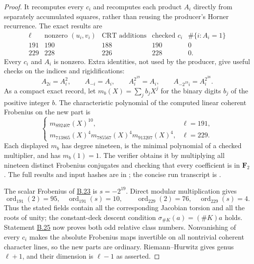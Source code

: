 \documentclass[11pt,a4paper]{article}
\newcommand{\statementref}[1]{\hyperlink{#1}{#1}}
\begin{document}
\begin{proof}
It recomputes every $c_i$ and recomputes each product $A_i$ directly
from separately accumulated squares, rather than reusing the
producer's Horner recurrence. The exact results are
\[
 \begin{array}{c|r|r|r|r}
 \ell&\text{nonzero }(u_i,v_i)&\text{CRT additions}&
                 \text{checked }c_i&\#\{i:A_i=1\}\\ \hline
 191&190&188&190&0\\
 229&228&226&228&0.
 \end{array}
\]
Every $c_i$ and $A_i$ is nonzero. Extra identities, not used by
the producer, give useful checks on the indices and rigidifications:
\[
 A_{2i}=A_i^2,\qquad A_{-i}=A_i,\qquad
 A_i^{2^{19}}=A_i,\qquad
 A_{-2^{19}i}=A_i^{2^{38}}.
\]
As a compact exact record, let $m_b(X)=\sum_j b_jX^j$ for the
binary digits $b_j$ of the positive integer $b$. The characteristic
polynomial of the computed linear coherent Frobenius on the new
part is
\[
 \begin{cases}
 m_{892407}(X)^{10},&\ell=191,\\
 m_{713865}(X)^4m_{785567}(X)^4m_{913207}(X)^4,&\ell=229.
 \end{cases}
\]
Each displayed $m_b$ has degree nineteen, is the minimal polynomial
of a checked multiplier, and has $m_b(1)=1$. The verifier obtains
it by multiplying all nineteen distinct Frobenius conjugates and
checking that every coefficient is in $\mathbf F_2$.
The full results and input hashes are in
; the concise run transcript is
.

The scalar Frobenius of \statementref{B.23} is $s=-2^{19}$.
Direct modular multiplication gives
\[
 \operatorname{ord}_{191}(2)=95,
 \quad\operatorname{ord}_{191}(s)=10,
 \qquad
 \operatorname{ord}_{229}(2)=76,
 \quad\operatorname{ord}_{229}(s)=4.
\]
Thus the stated fields contain all the corresponding Jacobian
torsion and all the roots of unity; the constant-deck descent
condition $\sigma_{\#K}(a)=(\#K)a$ holds. Statement
\statementref{B.25} now proves both odd relative class numbers.
Nonvanishing of every $c_i$ makes the absolute Frobenius maps
invertible on all nontrivial coherent character lines, so the
new parts are ordinary. Riemann--Hurwitz gives genus $\ell+1$,
and their dimension is $\ell-1$ as asserted.
\end{proof}
\end{document}
